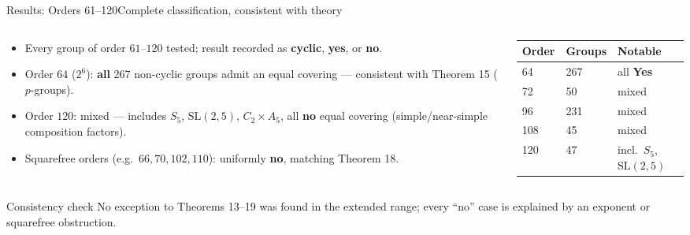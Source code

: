 \documentclass[9pt,aspectratio=169]{beamer}
\begin{document}
\begin{frame}{Results: Orders 61--120}{Complete classification, consistent with theory}
\begin{columns}[T]
\begin{column}{0.55\textwidth}
\begin{itemize}
\item Every group of order $61$--$120$ tested; result recorded as \textbf{cyclic}, \textbf{yes}, or \textbf{no}.
\item Order $64$ ($2^6$): \textbf{all} 267 non-cyclic groups admit an equal covering — consistent with Theorem 15 ($p$-groups).
\item Order $120$: mixed — includes $S_5$, $\mathrm{SL}(2,5)$, $C_2\times A_5$, all \textbf{no} equal covering (simple/near-simple composition factors).
\item Squarefree orders (e.g.\ $66,70,102,110$): uniformly \textbf{no}, matching Theorem 18.
\end{itemize}
\end{column}
\begin{column}{0.45\textwidth}
\small
\begin{tabular}{lll}
\toprule
Order & Groups & Notable \\
\midrule
64 & 267 & all \textbf{Yes} \\
72 & 50 & mixed \\
96 & 231 & mixed \\
108 & 45 & mixed \\
120 & 47 & incl.\ $S_5$, $\mathrm{SL}(2,5)$ \\
\bottomrule
\end{tabular}
\end{column}
\end{columns}
\begin{alertblock}{Consistency check}
No exception to Theorems 13--19 was found in the extended range; every ``no'' case is explained by an exponent or squarefree obstruction.
\end{alertblock}
\end{frame}
\end{document}
